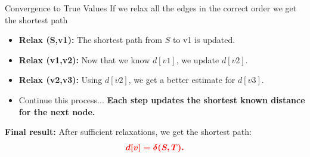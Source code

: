 \documentclass{beamer}
\begin{document}
    \begin{frame}{Convergence to True Values}
        If we relax all the edges in the correct order we get the shortest path
          \begin{center}
            \end{center}

    \begin{itemize}
        \item \textbf{Relax (S,v1):}
              The shortest path from $S$ to v1 is updated.
        \item \textbf{Relax (v1,v2):}
              Now that we know $d[v1]$, we update $d[v2]$.
        \item \textbf{Relax (v2,v3):}
              Using $d[v2]$, we get a better estimate for $d[v3]$.
        \item Continue this process... 
              \textbf{Each step updates the shortest known distance for the next node.}
    \end{itemize}

    \vspace{0.3cm}

    \textbf{Final result:}  
    After sufficient relaxations, we get the shortest path:
    \[
    \textcolor{red}{\boldsymbol{d[v] = \delta(S, T).}}
    \]
         
    \end{frame}
\end{document}
